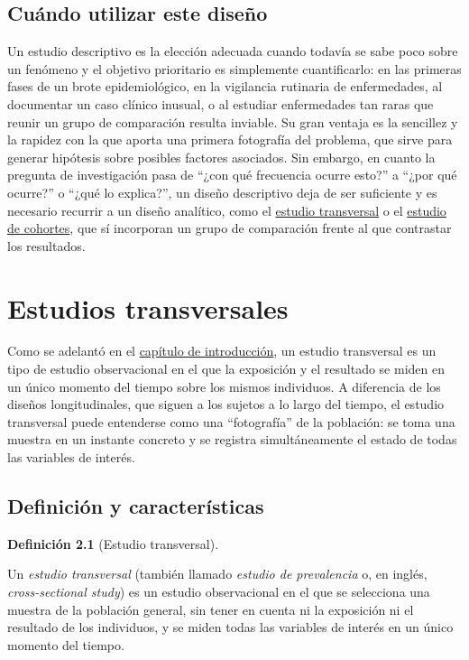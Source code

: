 \documentclass[
  spanish,
  a4paper,
]{scrreport}
\theoremstyle{definition}
\theoremstyle{definition}
\newtheorem{definition}{Definición}[chapter]
\theoremstyle{remark}
\begin{document}
\section{Cuándo utilizar este
diseño}\label{cuuxe1ndo-utilizar-este-diseuxf1o}

Un estudio descriptivo es la elección adecuada cuando todavía se sabe
poco sobre un fenómeno y el objetivo prioritario es simplemente
cuantificarlo: en las primeras fases de un brote epidemiológico, en la
vigilancia rutinaria de enfermedades, al documentar un caso clínico
inusual, o al estudiar enfermedades tan raras que reunir un grupo de
comparación resulta inviable. Su gran ventaja es la sencillez y la
rapidez con la que aporta una primera fotografía del problema, que sirve
para generar hipótesis sobre posibles factores asociados. Sin embargo,
en cuanto la pregunta de investigación pasa de ``¿con qué frecuencia
ocurre esto?'' a ``¿por qué ocurre?'' o ``¿qué lo explica?'', un diseño
descriptivo deja de ser suficiente y es necesario recurrir a un diseño
analítico, como el \href{03-estudios-transversales.qmd}{estudio
transversal} o el \href{04-estudios-cohortes.qmd}{estudio de cohortes},
que sí incorporan un grupo de comparación frente al que contrastar los
resultados.

\chapter{Estudios transversales}\label{estudios-transversales}

Como se adelantó en el
\hyperref[introducciuxf3n-a-los-tipos-de-estudios-estaduxedsticos]{capítulo
de introducción}, un estudio transversal es un tipo de estudio
observacional en el que la exposición y el resultado se miden en un
único momento del tiempo sobre los mismos individuos. A diferencia de
los diseños longitudinales, que siguen a los sujetos a lo largo del
tiempo, el estudio transversal puede entenderse como una ``fotografía''
de la población: se toma una muestra en un instante concreto y se
registra simultáneamente el estado de todas las variables de interés.

\section{Definición y
características}\label{definiciuxf3n-y-caracteruxedsticas-1}

\begin{definition}[Estudio
transversal]\protect\hypertarget{def-transversales-estudio-transversal}{}\label{def-transversales-estudio-transversal}

Un \emph{estudio transversal} (también llamado \emph{estudio de
prevalencia} o, en inglés, \emph{cross-sectional study}) es un estudio
observacional en el que se selecciona una muestra de la población
general, sin tener en cuenta ni la exposición ni el resultado de los
individuos, y se miden todas las variables de interés en un único
momento del tiempo.

\end{definition}
\end{document}
